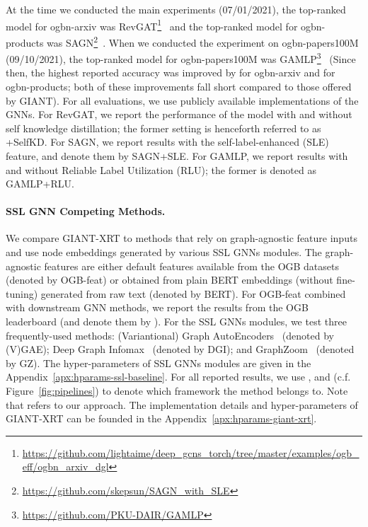 \documentclass{article} \usepackage{iclr2022_conference,times}
\begin{document}
At the time we conducted the main experiments (07/01/2021), the top-ranked model for ogbn-arxiv was RevGAT\footnote{\url{https://github.com/lightaime/deep_gcns_torch/tree/master/examples/ogb_eff/ogbn_arxiv_dgl}}~\citep{li2021training} and the top-ranked model for ogbn-products was SAGN\footnote{\url{https://github.com/skepsun/SAGN_with_SLE}}~\citep{sun2021scalable}. When we conducted the experiment on ogbn-papers100M (09/10/2021), the top-ranked model for ogbn-papers100M was GAMLP\footnote{\url{https://github.com/PKU-DAIR/GAMLP}}~\citep{zhang2021graph} (Since then, the highest reported accuracy was improved by  for ogbn-arxiv and  for ogbn-products; both of these improvements fall short compared to those offered by GIANT). For all evaluations, we use publicly available implementations of the GNNs. For RevGAT, we report the performance of the model with and without self knowledge distillation; the former setting is henceforth referred to as +SelfKD. For SAGN, we report results with the self-label-enhanced (SLE) feature, and denote them by SAGN+SLE. For GAMLP, we report results with and without Reliable Label Utilization (RLU); the former is denoted as GAMLP+RLU.

\paragraph{SSL GNN Competing Methods.}
We compare GIANT-XRT to methods that rely on graph-agnostic feature inputs and use node embeddings generated by various SSL GNNs modules. The graph-agnostic features are either default features available from the OGB datasets (denoted by OGB-feat) or obtained from plain BERT embeddings (without fine-tuning) generated from raw text (denoted by BERT). For OGB-feat combined with downstream GNN methods, we report the results from the OGB leaderboard (and denote them by ).
For the SSL GNNs modules, we test three frequently-used methods:
(Variantional) Graph AutoEncoders~\citep{kipf2016variational} (denoted by (V)GAE); Deep Graph Infomax~\citep{velickovic2019deep} (denoted by DGI); and GraphZoom~\citep{deng2020graphzoom} (denoted by GZ).
The hyper-parameters of SSL GNNs modules are given in the Appendix~\ref{apx:hparams-ssl-baseline}.
For all reported results, we use ,  and  (c.f. Figure~\ref{fig:pipelines}) to denote which framework the method belongs to. Note that  refers to our approach. The implementation details and hyper-parameters of GIANT-XRT can be founded in the Appendix~\ref{apx:hparams-giant-xrt}.
\end{document}
